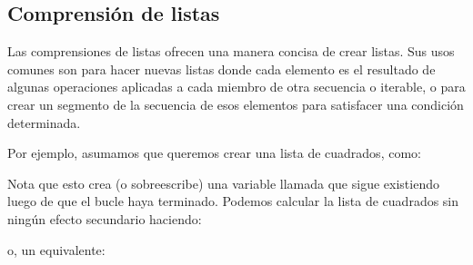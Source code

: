 \documentclass[a4,10pt,spanish]{sphinxmanual}
\begin{document}
\subsection{Comprensión de listas}
\label{\detokenize{tutorial/datastructures:list-comprehensions}}\label{\detokenize{tutorial/datastructures:tut-listcomps}}
\sphinxAtStartPar
Las comprensiones de listas ofrecen una manera concisa de crear listas. Sus usos comunes son para hacer nuevas listas donde cada elemento es el resultado de algunas operaciones aplicadas a cada miembro de otra secuencia o iterable, o para crear un segmento de la secuencia de esos elementos para satisfacer una condición determinada.

\sphinxAtStartPar
Por ejemplo, asumamos que queremos crear una lista de cuadrados, como:

\begin{sphinxVerbatim}[commandchars=\\\{\}]
  \PYG{p}{[}\PYG{p}{]}
   
    
\end{sphinxVerbatim}

\sphinxAtStartPar
Nota que esto crea (o sobreescribe) una variable llamada  que sigue existiendo luego de que el bucle haya terminado. Podemos calcular la lista de cuadrados sin ningún efecto secundario haciendo:

\begin{sphinxVerbatim}[commandchars=\\\{\}]
     
\end{sphinxVerbatim}

\sphinxAtStartPar
o, un equivalente:

\begin{sphinxVerbatim}[commandchars=\\\{\}]
  \PYG{p}{[}    \PYG{p}{]}
\end{sphinxVerbatim}
\end{document}
